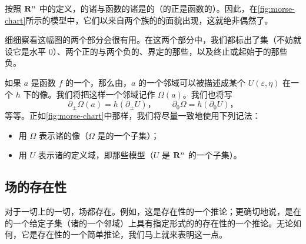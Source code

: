 \begin{remark}\label{thm:gradient-orthogonal-levels}
按照 $\mathbf{R}^n$ 中\trGradient{}的定义，\trGradient{}的诸\trTrajectory{}与函数的诸\trLevelSet{}是\trOrthogonal{}的（\trLevelSet{}的\trTangentSpace{}正是函数\trDifferential{}的\trKernel）。因此，在\cref{fig:morse-chart}所示的模型中，它们以来自两个\trOrthogonal{}族的\trRectangularHyperbola{}的面貌出现，这就绝非偶然了。

细细察看这幅图的两个部分会很有用。在这两个部分中，我们都标出了\trCriticalLevel{}集（不妨就设它是水平 $0$）、两个正的\trRegular\trLevelSet{}与两个负的\trRegular\trLevelSet{}、界定\trChart{}的那些\trGradient{}\trTrajectory，以及终止或起始于\trCriticalPoint{}的那些负\trGradient{}\trTrajectory。

如果 $a$ 是函数 $f$ 的一个\trCriticalPoint，那么由\trMorseLemma，$a$ 的一个邻域可以被描述成某个 $U(\varepsilon,\eta)$ 在一个\trDiffeomorphism{} $h$ 下的像。我们将把这样一个邻域记作 $\Omega(a)$。我们也将写
\[
\partial_\pm\Omega(a)=h(\partial_\pm U)\text{，}\qquad \partial_0\Omega=h(\partial_0 U)\text{，}
\]
等等。正如\cref{fig:morse-chart}中那样，我们将尽量一致地使用下列记法：
\begin{itemize}
\item 用 $\Omega$ 表示诸\trChart{}的像（$\Omega$ 是\trManifold{}的一个子集）；
\item 用 $U$ 表示诸\trChart{}的定义域，即那些模型（$U$ 是 $\mathbf{R}^n$ 的一个子集）。
\end{itemize}
\end{remark}

\subsection{\trPseudogradient{}场的存在性}
\label{subsec:existence-pseudogradients}

对于一切\trManifold{}上的一切\trMorseFunction，\trPseudogradient{}场都存在。例如，这是\trRiemann\trMetric{}存在性的一个推论；更确切地说，是在\trManifold{}的一个给定子集（诸\trCriticalPoint{}的一个邻域）上具有指定形式的\trRiemann\trMetric{}的存在性的一个推论。无论如何，它是\trPartitionOfUnity{}存在性的一个简单推论，我们马上就来表明这一点。

